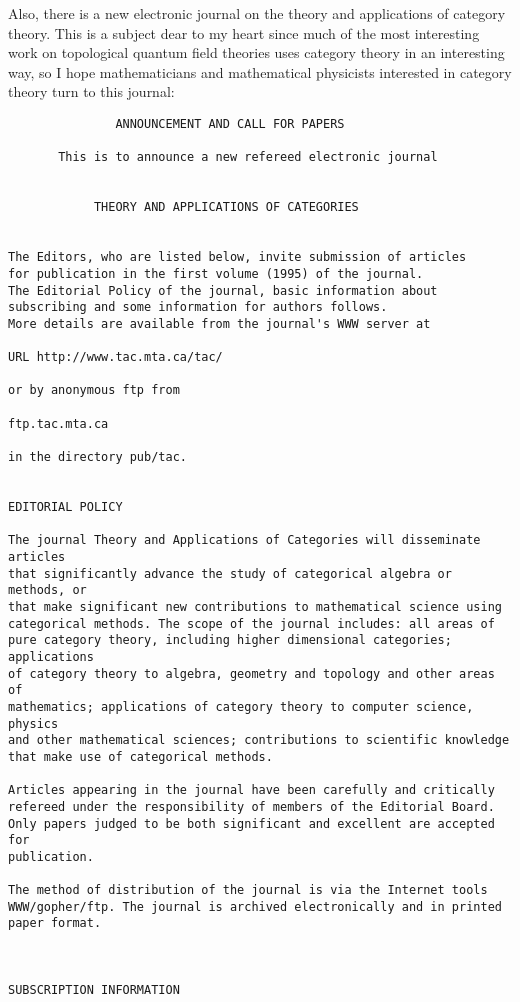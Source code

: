 \documentclass{article}
\begin{document}
Also, there is a new electronic journal on the theory and applications
of category theory. This is a subject dear to my heart since much of the
most interesting work on topological quantum field theories uses
category theory in an interesting way, so I hope mathematicians and
mathematical physicists interested in category theory turn to this
journal:

\begin{verbatim}
               ANNOUNCEMENT AND CALL FOR PAPERS
 
       This is to announce a new refereed electronic journal
 
 
            THEORY AND APPLICATIONS OF CATEGORIES
 
 
The Editors, who are listed below, invite submission of articles 
for publication in the first volume (1995) of the journal.   
The Editorial Policy of the journal, basic information about 
subscribing and some information for authors follows. 
More details are available from the journal's WWW server at
 
URL http://www.tac.mta.ca/tac/
 
or by anonymous ftp from
 
ftp.tac.mta.ca
 
in the directory pub/tac.
 
 
EDITORIAL POLICY
 
The journal Theory and Applications of Categories will disseminate articles 
that significantly advance the study of categorical algebra or methods, or 
that make significant new contributions to mathematical science using 
categorical methods. The scope of the journal includes: all areas of 
pure category theory, including higher dimensional categories; applications 
of category theory to algebra, geometry and topology and other areas of 
mathematics; applications of category theory to computer science, physics 
and other mathematical sciences; contributions to scientific knowledge 
that make use of categorical methods.
 
Articles appearing in the journal have been carefully and critically 
refereed under the responsibility of members of the Editorial Board.
Only papers judged to be both significant and excellent are accepted for 
publication. 
 
The method of distribution of the journal is via the Internet tools 
WWW/gopher/ftp. The journal is archived electronically and in printed 
paper format. 
 
 
 
SUBSCRIPTION INFORMATION
 

\end{verbatim}
\end{document}

